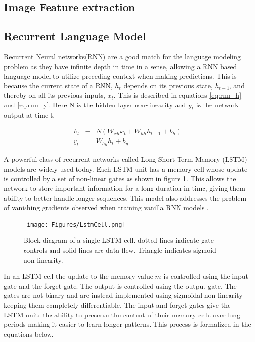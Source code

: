 
\subsection{Image Feature extraction}


\subsection{Recurrent Language Model}
Recurrent Neural networks(RNN) are a good match for the language modeling
problem as they have infinite depth in time in a sense, allowing a RNN based
language model to utilize preceding context when making predictions. This is
because the current state of a RNN, $h_t$ depends on its previous state,
$h_{t-1}$, and thereby on all its previous inputs, $x_t$. This is described in
equations \ref{eq:rnn_h} and \ref{eq:rnn_y}. Here N is the hidden layer
non-linearity and $y_t$ is the network output at time t.

\begin{eqnarray}
    \label{eq:rnn_h} h_t &=& N(W_{xh}x_t+W_{hh}h_{t-1}+b_h)\\
    \label{eq:rnn_y} y_t &=& W_{hy}h_t + b_y
\end{eqnarray} 

A powerful class of recurrent networks called Long Short-Term Memory
(LSTM) models \cite{Hochreiter:1997:LSM:1246443.1246450} are widely used today.
Each LSTM unit has a memory cell whose update is controlled by a set of
non-linear gates as shown in figure \ref{fig:lstmcell}. This allows the network
to store important information for a long duration in time, giving them ability
to better handle longer sequences. This model also addresses the problem of
vanishing gradients observed when training vanilla RNN models
\cite{Bengio93Vanishing}\cite{pascanu2012difficulty}.

\begin{figure}[h]
	\begin{center}
		\texttt{[image: Figures/LstmCell.png]}
	\end{center}
	\caption{Block diagram of a single LSTM cell. dotted lines indicate
		gate controls and solid lines are data flow. Triangle indicates
		sigmoid non-linearity.}
	\label{fig:lstmcell}
\end{figure}

In an LSTM cell the update to the memory value $m$ is controlled using the
input gate and the forget gate.  The output is controlled using the output
gate. The gates are not binary and are instead implemented using sigmoidal
non-linearity keeping them completely differentiable. 
The input and forget gates give the LSTM units the ability to preserve the
content of their memory cells over long periods making it easier to learn
longer patterns.
This process is formalized in the equations below.

